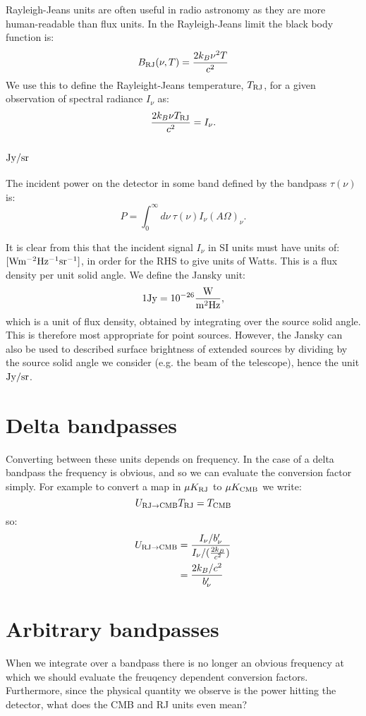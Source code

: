\documentclass[12pt]{article}
\begin{document}
Rayleigh-Jeans units are often useful in radio astronomy as they are more human-readable than
flux units. In the Rayleigh-Jeans limit the black body function is:
\[
B_{\rm RJ}(\nu, T) = \frac{2 k_B \nu^2 T}{c^2}
\]
We use this to define the Rayleight-Jeans temperature, $T_{\rm RJ}$, for a given observation of spectral
radiance $I_\nu$ as:
\[
\frac{2 k_B \nu T_{\rm RJ}}{c^2} = I_\nu.
\]

\subsection{${\rm Jy / sr}$}
The incident power on the detector in some band defined by the bandpass $\tau(\nu)$ is:
\[
P = \int_0^\infty d\nu \ \tau(\nu) I_\nu (A \Omega)_\nu.
\]

It is clear from this that the incident signal $I_\nu$ in SI units must have units of:
$[{\rm W m^{-2}Hz^{-1} sr^{-1}}]$, in order for the RHS to give units of Watts. This is a flux density
per unit solid angle.  We define the Jansky unit:
\[
1 {\rm Jy} = 10^{-26} \frac{{\rm W}}{{\rm m^2 Hz}},
\]
which is a unit of flux density, obtained by integrating over the source solid angle. This is
therefore most appropriate for point sources. However, the Jansky can also be used to described
surface brightness of extended sources by dividing by the source solid angle we consider (e.g.
the beam of the telescope), hence the unit ${\rm Jy / sr}$.

\section{Delta bandpasses}

Converting between these units depends on frequency. In the case of a delta bandpass the frequency
is obvious, and so we can evaluate the conversion factor simply. For example to convert a map
in $\mu K_{\rm RJ}$ to $\mu K_{\rm CMB}$ we write:
\[
U_{\rm RJ \rightarrow CMB} T_{\rm RJ} = T_{\rm CMB} 
\]
so:
\[
\begin{aligned}
  U_{\rm RJ \rightarrow CMB} &= \frac{I_\nu / b^\prime_\nu}{I_\nu / (\frac{2 k_B}{c^2})} \\
  &= \frac{2 k_B / c^2}{b^\prime_\nu}
\end{aligned}
\]

\section{Arbitrary bandpasses}

When we integrate over a bandpass there is no longer an obvious frequency at which we should
evaluate the freuqency dependent conversion factors. Furthermore, since the physical quantity
we observe is the power hitting the detector, what does the CMB and RJ units even mean?
\end{document}
